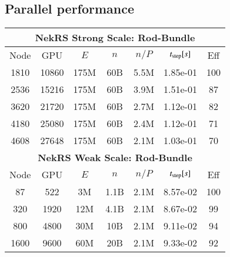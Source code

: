 
\vspace{-.25in}
\subsection{Parallel performance}
\vspace{-.2in}


 \begin{table}[!b]
 \footnotesize
 \begin{center} \begin{tabular}{|c|c|c|c|c|c|c|}
  \hline
  \multicolumn{7}{|c|}{{\bf NekRS Strong Scale:  Rod-Bundle}}\\
  \hline
 Node & GPU   & $E$ & $n$ & $n/P$ & $t_{\rm step} [s] $ & Eff  \\
 \hline
 1810 &10860 &  175M & 60B &5.5M &1.85e-01 & 100  \\
 2536 &15216 &  175M & 60B &3.9M &1.51e-01 &  87  \\
 3620 &21720 &  175M & 60B &2.7M &1.12e-01 &  82  \\
 4180 &25080 &  175M & 60B &2.4M &1.12e-01 &  71  \\
 4608 &27648 &  175M & 60B &2.1M &1.03e-01 &  70  \\
  \hline
 \hline
  \multicolumn{7}{|c|}{{\bf NekRS Weak Scale: Rod-Bundle}}\\
  \hline
 Node & GPU &  $E$ & $n$      &  $n/P$& $t_{\rm step}[s]$ & Eff \\
 \hline
 87   & 522   & 3M        & 1.1B  &  2.1M  & 8.57e-02  & 100   \\%
 320  & 1920  & 12M       & 4.1B  &  2.1M  & 8.67e-02  & 99    \\%
 800  & 4800  & 30M       & 10B   &  2.1M  & 9.11e-02  & 94    \\%
 1600 & 9600  & 60M       & 20B   &  2.1M  & 9.33e-02  & 92    \\%

\end{tabular}
\end{center}
\end{table}
